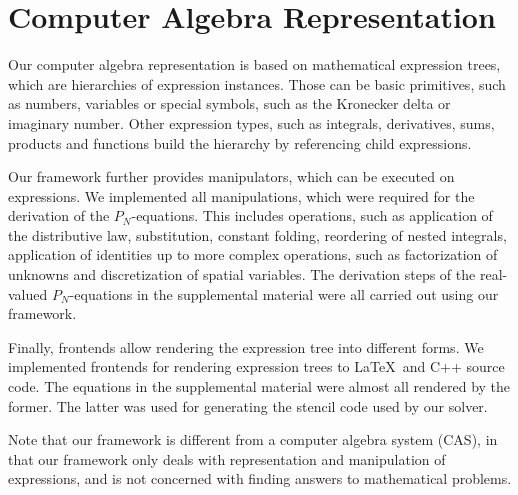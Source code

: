 \section{Computer Algebra Representation}
\label{sec:car}

Our computer algebra representation is based on mathematical expression trees, which are hierarchies of expression instances. Those can be basic primitives, such as numbers, variables or special symbols, such as the Kronecker delta or imaginary number. Other expression types, such as integrals, derivatives, sums, products and functions build the hierarchy by referencing child expressions.

Our framework further provides manipulators, which can be executed on expressions. We implemented all manipulations, which were required for the derivation of the $P_N$-equations. This includes operations, such as application of the distributive law, substitution, constant folding, reordering of nested integrals, application of identities up to more complex operations, such as factorization of unknowns and discretization of spatial variables. The derivation steps of the real-valued $P_N$-equations in the supplemental material were all carried out using our framework.

Finally, frontends allow rendering the expression tree into different forms. We implemented frontends for rendering expression trees to \LaTeX~and C++ source code. The equations in the supplemental material were almost all rendered by the former. The latter was used for generating the stencil code used by our solver.

Note that our framework is different from a computer algebra system (CAS), in that our framework only deals with representation and manipulation of expressions, and is not concerned with finding answers to mathematical problems. 
